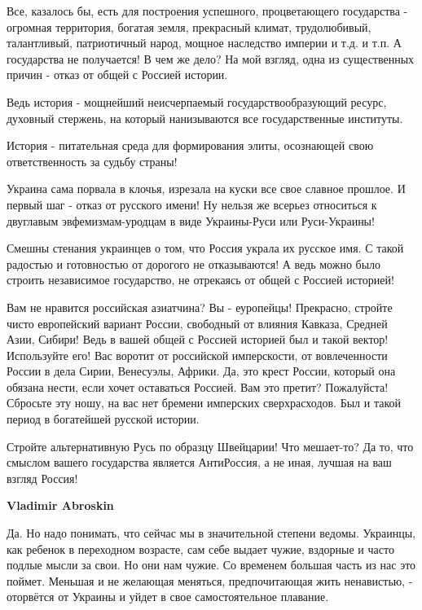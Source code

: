 \begin{itemize}
Все, казалось бы, есть для построения успешного, процветающего государства -
огромная территория, богатая земля, прекрасный климат, трудолюбивый,
талантливый, патриотичный народ, мощное наследство империи и т.д. и т.п. А
государства не получается! В чем же дело? На мой взгляд, одна из существенных
причин - отказ от общей с Россией истории. 

Ведь история - мощнейший неисчерпаемый государствообразующий ресурс, духовный
стержень, на который нанизываются все государственные институты. 

История - питательная среда для формирования элиты, осознающей свою
ответственность за судьбу страны! 

Украина сама порвала в клочья, изрезала на куски все свое славное прошлое. И
первый шаг - отказ от русского имени! Ну нельзя же всерьез относиться к
двуглавым эвфемизмам-уродцам в виде Украины-Руси или Руси-Украины! 

Смешны стенания украинцев о том, что Россия украла их русское имя. С такой
радостью и готовностью от дорогого не отказываются! А ведь можно было строить
независимое государство, не отрекаясь от общей с Россией историей! 

Вам не нравится российская азиатчина? Вы - еуропейцы! Прекрасно, стройте чисто
европейский вариант России, свободный от влияния Кавказа, Средней Азии, Сибири!
Ведь в вашей общей с Россией историей был и такой вектор! Используйте его! Вас
воротит от российской имперскости, от вовлеченности России в дела Сирии,
Венесуэлы, Африки. Да, это крест России, который она обязана нести, если хочет
оставаться Россией. Вам это претит? Пожалуйста! Сбросьте эту ношу, на вас нет
бремени имперских сверхрасходов. Был и такой период в богатейшей русской
истории.

Стройте альтернативную Русь по образцу Швейцарии! Что мешает-то? Да то, что
смыслом вашего государства является АнтиРоссия, а не иная, лучшая на ваш взгляд
Россия!


\begin{itemize}
 
\textbf{Vladimir Abroskin} 

Да. Но надо понимать, что сейчас мы в значительной степени ведомы. Украинцы,
как ребенок в переходном возрасте, сам себе выдает чужие, вздорные и часто
подлые мысли за свои. Но они нам чужие. Со временем большая часть из нас это
поймет. Меньшая и не желающая меняться, предпочитающая жить ненавистью, -
оторвётся от Украины и уйдет в свое самостоятельное плавание.
\end{itemize}


\end{itemize}
